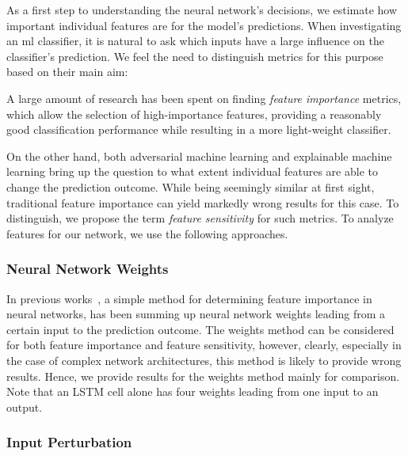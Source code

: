 \documentclass[conference]{IEEEtran}
\begin{document}
As a first step to understanding the neural network's decisions, we  estimate how important individual features are for the model's predictions.
When investigating an \gls{ml} classifier, it is natural to ask which inputs have a large influence on the classifier's prediction. We feel the need to distinguish metrics for this purpose based on their main aim:

A large amount of research has been spent on finding \emph{feature importance} metrics, which allow the selection  of high-importance features, providing a reasonably good classification performance while resulting in a more light-weight classifier.

On the other hand, both adversarial machine learning and explainable machine learning bring up the question to what extent individual features are able to change the prediction outcome. While being seemingly similar at first sight, traditional feature importance can yield markedly wrong results for this case.  To distinguish, we propose the term \emph{feature sensitivity} for such metrics.
To analyze features for our network, we use the following approaches.

\subsubsection{Neural Network Weights}
In previous works~\cite{olden_accurate_2004}, a simple method for determining feature importance in neural networks, has been summing up neural network weights leading from a certain input to the prediction outcome. The weights method can be considered for both feature importance and feature sensitivity, however, clearly, especially in the case of complex network architectures, this method is likely to provide wrong results. Hence, we provide results for the weights method mainly for comparison. Note that an LSTM cell alone has four weights leading from one input to an output.

\subsubsection{Input Perturbation}
\end{document}

